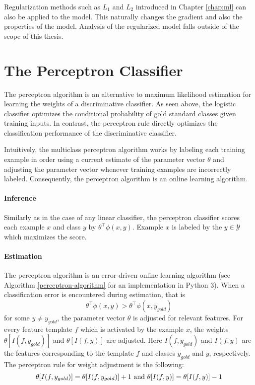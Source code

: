 Regularization methods such as $L_1$ and $L_2$ introduced in Chapter
\ref{chap:ml} can also be applied to the model. This naturally changes
the gradient and also the properties of the model. Analysis of the
regularized model falls outside of the scope of this thesis.

\section{The Perceptron Classifier}
\label{sec:perc}

The perceptron algorithm \citep{Rosenblatt1958} is an alternative to
maximum likelihood estimation for learning the weights of a
discriminative classifier. As seen above, the logistic classifier
optimizes the conditional probability of gold standard classes given
training inputs. In contrast, the perceptron rule directly optimizes
the classification performance of the discriminative classifier. 

Intuitively, the multiclass perceptron algorithm works by labeling
each training example in order using a current estimate of the
parameter vector $\theta$ and adjusting the parameter vector whenever
training examples are incorrectly labeled. Consequently, the perceptron
algorithm is an online learning algorithm.

\paragraph{Inference} Similarly as in the case of any linear
classifier, the perceptron classifier scores each example $x$ and class $y$ by
$\theta^\top\phi(x,y)$. Example $x$ is labeled by the $y \in \mathcal{Y}$ which maximizes the score.


\paragraph{Estimation} The perceptron algorithm is an error-driven
online learning algorithm (see Algorithm \ref{perceptron-algorithm} for an
implementation in Python 3). When a classification error is encountered
during estimation, that is 
$$\theta^\top\phi(x,y) >
\theta^\top\phi(x,y_{gold})$$ for some $y \ne y_{gold}$, the parameter
vector $\theta$ is adjusted for relevant features. For every feature
template $f$ which is activated by the example $x$, the weights
$\theta[I(f, y_{gold})]$ and $\theta[I(f, y)]$ are adjusted. Here
$I(f, y_{gold})$ and $I(f, y)$ are the features corresponding to the
template $f$ and classes $y_{gold}$ and $y$, respectively. The
perceptron rule for weight adjustment is the following:
$$\theta[I(f, y_{gold})] = \theta[I(f, y_{gold})] + 1 {\rm\ and\ }\theta[I(f, y)] = \theta[I(f, y)] - 1$$

